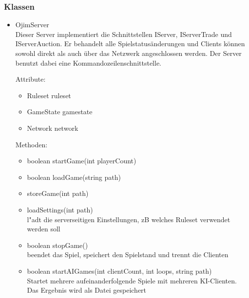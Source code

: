 \documentclass[a4paper,10pt]{article}
\begin{document}
\subsubsection{Klassen}
\begin{itemize}
\item OjimServer \\
Dieser Server implementiert die Schnittstellen IServer, IServerTrade und IServerAuction. Er behandelt alle Spielstatusänderungen und Clients können sowohl direkt als auch über das Netzwerk angeschlossen werden. Der Server benutzt dabei eine Kommandozeilenschnittstelle.

Attribute:
\begin{itemize}
\item Ruleset ruleset
\item GameState gamestate
\item Network network
\end{itemize}

Methoden:
\begin{itemize}
\item boolean startGame(int playerCount) 
\item boolean loadGame(string path)
\item storeGame(int path)
\item loadSettings(int path)
\\l"adt die serverseitigen Einstellungen, zB welches Ruleset verwendet werden soll
\item boolean stopGame()
\\beendet das Spiel, speichert den Spielstand und trennt die Clienten
\item boolean startAIGames(int clientCount, int loops, string path)
\\Startet mehrere aufeinanderfolgende Spiele mit mehreren KI-Clienten. Das Ergebnis wird als Datei gespeichert
\end{itemize} %
\end{itemize} %
\end{document}
